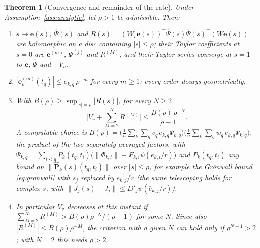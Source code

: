 \documentclass[11pt]{article}
\newtheorem{theorem}{Theorem}
\theoremstyle{definition}
\theoremstyle{remark}
\newcommand{\ee}{\mathbf{e}}
\newcommand{\Ph}{\hat{\mathbf P}}
\newcommand{\Psih}{\hat\Psi}
\begin{document}
\begin{theorem}[Convergence and remainder of the rate]\label{thm:tradeoffbound}
Under Assumption~\ref{ass:analytic}, let $\rho>1$ be admissible. Then:
\begin{enumerate}
\item $s\mapsto\ee(s)$, $\Psih(s)$ and $R(s)=(W_v\ee(s))^\top\Psih(s)\Psih(s)^\top(W\ee(s))$ are holomorphic on a disc containing $|s|\le\rho$; their Taylor coefficients at $s=0$ are $\ee^{(m)}$, $\Psi^{(j)}$ and $R^{(M)}$, and their Taylor series converge at $s=1$ to $\ee$, $\Psih$ and $-\dot V_v$.
\item $|\ee^{(m)}_k(t_q)|\le\bar e_{k,q}\,\rho^{-m}$ for every $m\ge1$: every order decays geometrically.
\item With $B(\rho)\ge\sup_{|s|=\rho}|R(s)|$, for every $N\ge2$
\begin{equation}\label{eq:tradeoffremainder}
\Big|\dot V_v+\sum_{M=2}^{N}R^{(M)}\Big|\le\frac{B(\rho)\,\rho^{-N}}{\rho-1}.
\end{equation}
A computable choice is $B(\rho)=\Big(\frac1n\sum_k\sum_qv_q\,\bar e_{k,q}\bar\Psi_{k,q}\Big)\Big(\frac1n\sum_k\sum_qw_q\,\bar e_{k,q}\bar\Psi_{k,q}\Big)$, the product of the two separately averaged factors, with $\bar\Psi_{k,q}=\sum_{i<q}\overline P_{k}(t_q,t_i)\big(\|\Phi_{k,i}\|+F_{k,i}\psi(\bar e_{k,i}/r)\big)$ and $\overline P_k(t_q,t_i)$ any bound on $\|\Ph_k(s)(t_q,t_i)\|$ over $|s|\le\rho$, for example the Grönwall bound \eqref{eq:gronwall} with $s_j$ replaced by $\bar e_{k,j}/r$ (the same telescoping holds for complex $s$, with $\|\hat J_j(s)-J_j\|\le D'_j\psi(\bar e_{k,j}/r)$).
\item In particular $V_v$ decreases at this instant if $\sum_{M=2}^NR^{(M)}>B(\rho)\rho^{-N}/(\rho-1)$ for some $N$. Since also $|R^{(M)}|\le B(\rho)\rho^{-M}$, the criterion with a given $N$ can hold only if $\rho^{N-1}>2$; with $N=2$ this needs $\rho>2$.
\end{enumerate}
\end{theorem}
\end{document}
